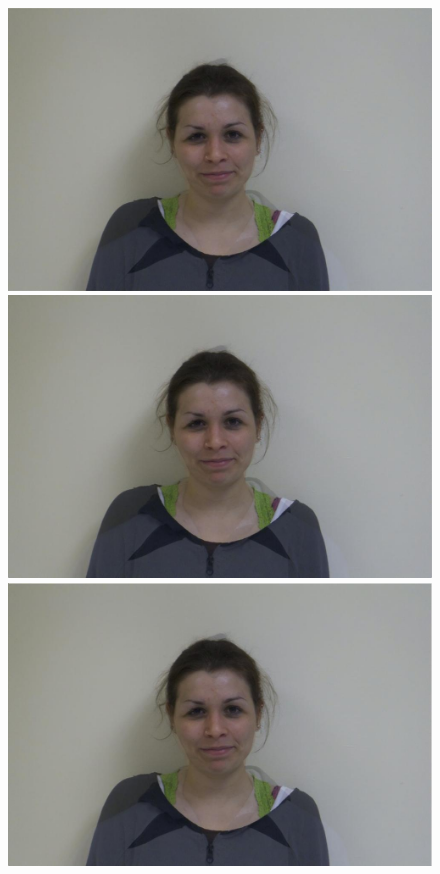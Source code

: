 \documentclass[11pt]{article}
\begin{document}
\begin{figure}[H]
\begin{center}
\includegraphics[scale=0.06]{figs/frames/morph_steinkirch_tangatur_13.jpg} 
\includegraphics[scale=0.06]{figs/frames/morph_steinkirch_tangatur_14.jpg} 
\includegraphics[scale=0.06]{figs/frames/morph_steinkirch_tangatur_15.jpg}  

\end{center}
\end{figure}
\end{document}
